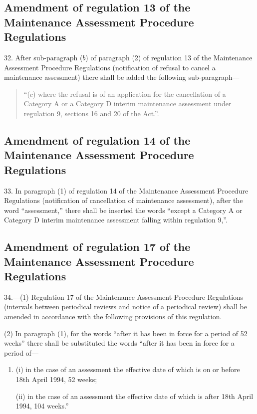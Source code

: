 \documentclass[a4paper]{article}
\begin{document}
\subsection[32. Amendment of regulation 13 of the Maintenance Assessment Procedure Regulations]{Amendment of regulation 13 of the Maintenance Assessment Procedure Regulations}

32.  After sub-paragraph ($b$) of paragraph (2) of regulation 13 of the Maintenance Assessment Procedure Regulations (notification of refusal to cancel a maintenance assessment) there shall be added the following sub-paragraph—
\begin{quotation}
“($c$) where the refusal is of an application for the cancellation of a Category A or a Category D interim maintenance assessment under regulation 9, sections 16 and 20 of the Act.”.
\end{quotation}

\subsection[33. Amendment of regulation 14 of the Maintenance Assessment Procedure Regulations]{Amendment of regulation 14 of the Maintenance Assessment Procedure Regulations}

33.  In paragraph (1) of regulation 14 of the Maintenance Assessment Procedure Regulations (notification of cancellation of maintenance assessment), after the word “assessment,” there shall be inserted the words “except a Category A or Category D interim maintenance assessment falling within regulation 9,”.

\subsection[34. Amendment of regulation 17 of the Maintenance Assessment Procedure Regulations]{Amendment of regulation 17 of the Maintenance Assessment Procedure Regulations}

34.—(1) Regulation 17 of the Maintenance Assessment Procedure Regulations (intervals between periodical reviews and notice of a periodical review) shall be amended in accordance with the following provisions of this regulation.

(2) In paragraph (1), for the words “after it has been in force for a period of 52 weeks” there shall be substituted the words “after it has been in force for a period of—
\begin{enumerate}\item[]
(i) in the case of an assessment the effective date of which is on or before 18th April 1994, 52 weeks;

(ii) in the case of an assessment the effective date of which is after 18th April 1994, 104 weeks.”
\end{enumerate}
\end{document}
